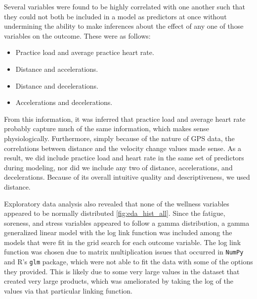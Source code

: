 \documentclass{article}
\begin{document}
			Several variables were found to be highly correlated with one
			another such that they could not both be included in a model
			as predictors at once without undermining the ability to make
			inferences about the effect of any one of those variables on
			the outcome. These were as follows:

			\begin{itemize}
				\item Practice load and average practice heart rate.
				\item Distance and accelerations.
				\item Distance and decelerations.
				\item Accelerations and decelerations.
			\end{itemize}

			From this information, it was inferred that practice load
			and average heart rate probably capture much of the same
			information, which makes sense physiologically. Furthermore,
			simply because of the nature of GPS data, the correlations
			between distance and the velocity change values made sense.
			As a result, we did include practice load and heart rate in
			the same set of predictors during modeling, nor did we include
			any two of distance, accelerations, and decelerations. Because
			of its overall intuitive quality and descriptiveness, we
			used distance.

			Exploratory data analysis also revealed that none of the wellness
			variables appeared to be normally distributed \ref{fig:eda_hist_all}.
			Since the fatigue, soreness, and stress variables appeared to follow
			a gamma distribution, a gamma generalized linear model with the log
			link function was included among the models that were fit in the grid
			search for each outcome variable. The log link function was chosen
			due to matrix multiplication issues that occurred in \texttt{NumPy}
			and R's \texttt{glm} package, which were not able to fit the data
			with some of the options they provided. This is likely due to some
			very large values in the dataset that created very large products,
			which was ameliorated by taking the log of the values via that
			particular linking function.

\end{document}
